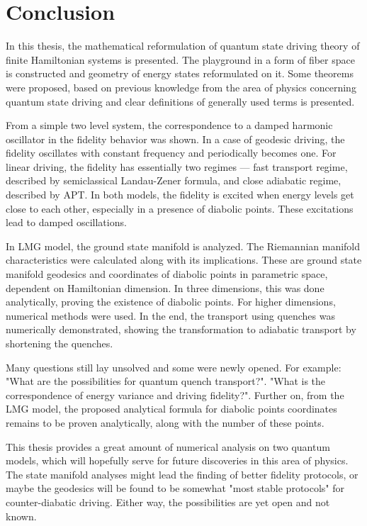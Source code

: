 \chapter*{Conclusion}
In this thesis, the mathematical reformulation of quantum state driving theory of finite Hamiltonian systems is presented. The playground in a form of fiber space is constructed and geometry of energy states reformulated on it. Some theorems were proposed, based on previous knowledge from the area of physics concerning quantum state driving and clear definitions of generally used terms is presented.

From a simple two level system, the correspondence to a damped harmonic oscillator in the fidelity behavior was shown. In a case of geodesic driving, the fidelity oscillates with constant frequency and periodically becomes one. For linear driving, the fidelity has essentially two regimes — fast transport regime, described by semiclassical Landau-Zener formula, and close adiabatic regime, described by APT. In both models, the fidelity is excited when energy levels get close to each other, especially in a presence of diabolic points. These excitations lead to damped oscillations.

In LMG model, the ground state manifold is analyzed. The Riemannian manifold characteristics were calculated along with its implications. These are ground state manifold geodesics and coordinates of diabolic points in parametric space, dependent on Hamiltonian dimension. In three dimensions, this was done analytically, proving the existence of diabolic points. For higher dimensions, numerical methods were used. In the end, the transport using quenches was numerically demonstrated, showing the transformation to adiabatic transport by shortening the quenches.

Many questions still lay unsolved and some were newly opened. For example: "What are the possibilities for quantum quench transport?". "What is the correspondence of energy variance and driving fidelity?". Further on, from the LMG model, the proposed analytical formula for diabolic points coordinates remains to be proven analytically, along with the number of these points.

This thesis provides a great amount of numerical analysis on two quantum models, which will hopefully serve for future discoveries in this area of physics. The state manifold analyses might lead the finding of better fidelity protocols, or maybe the geodesics will be found to be somewhat "most stable protocols" for counter-diabatic driving. Either way, the possibilities are yet open and not known.